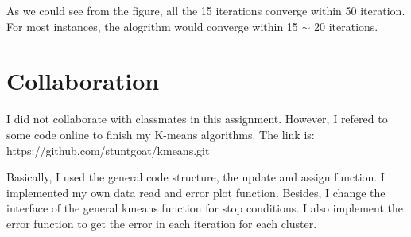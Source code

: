 \documentclass{article} %
\begin{document}
As we could see from the figure, all the 15 iterations converge within 50
iteration. For most instances, the alogrithm would converge within 15 $\sim$ 20
iterations.



\section{Collaboration}
I did not collaborate with classmates in this assignment. However, I refered to
some code online to finish my K-means algorithms. The link is:
https://github.com/stuntgoat/kmeans.git

Basically, I used the general code structure, the update and assign function.
I implemented my own data read and error plot function. Besides, I change the
interface of the general kmeans function for stop conditions. I also implement
the error function to get the error in each iteration for each cluster.
\end{document}
